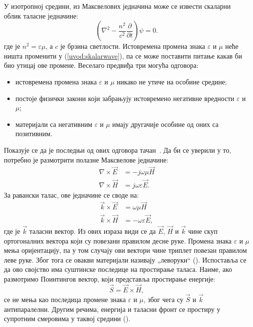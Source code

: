\documentclass[main.tex]{subfiles}
\begin{document}
У изотропној средини, из Максвелових једначина може се извести скаларни облик таласне једначине:
\begin{equation}
    \left( \nabla^2 - \frac{n^2}{c^2}\frac{\partial}{\partial t} \right) \psi = 0.
    \label{uvod:skalarwave}
\end{equation}
где је $n^2 = \varepsilon\mu$, а $c$ је брзина светлости. Истовремена промена знака $\varepsilon$ и $\mu$ неће ништа променити у (\ref{uvod:skalarwave}), па се може поставити питање какав би био утицај ове промене. Веселаго предвиђа три могућа одговора:
\begin{itemize}
    \item истовремена промена знака $\varepsilon$ и $\mu$ никако не утиче на особине средине;
    \item постоје физички закони који забрањују истовремено негативне вредности $\varepsilon$ и $\mu$;
    \item материјали са негативним $\varepsilon$ и $\mu$ имају другачије особине од оних са позитивним.
\end{itemize}
Показује се да је последњи од ових одговора тачан~\cite{veselago_cir}. Да би се уверили у то, потребно је размотрити полазне Максвелове једначине:
\begin{align}
    \nabla\times \vec{E} & = -j\omega\mu \vec{H} \\
    \nabla\times \vec{H} & =  j\omega\varepsilon \vec{E} .
\end{align}
За равански талас, ове једначине се своде на:
\begin{align}
    \vec{k} \times \vec{E} & =  \omega\mu\vec{H} \\
    \vec{k} \times \vec{H} & = -\omega\varepsilon\vec{E} ,
\end{align}
где је $\vec{k}$ таласни вектор. Из ових израза види се да $\vec{E}$, $\vec{H}$ и $\vec{k}$ чине скуп ортогоналних вектора који су повезани правилом десне руке. Промена знака $\varepsilon$ и $\mu$ мења оријентацију, па у том случају ови вектори чине триплет повезан правилом леве руке. Због тога се овакви материјали називају „леворуки`` (). Испоставља се да ово својство има суштинске последице на простирање таласа. Наиме, ако размотримо Поинтингов вектор, који представља простирање енергије:
\begin{equation}
    \vec{S} = \vec{E} \times \vec{H},
\end{equation}
се не мења као последица промене знака $\varepsilon$ и $\mu$, због чега су $\vec{S}$ и $\vec{k}$ антипаралелни. Другим речима, енергија и таласни фронт се простиру у супротним смеровима у таквој средини ().
\end{document}

